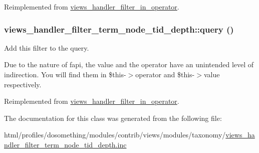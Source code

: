 Reimplemented from \hyperlink{classviews__handler__filter__in__operator_a5b972dd25d26a7010ae9f63cbc926577}{views\_\-handler\_\-filter\_\-in\_\-operator}.\hypertarget{classviews__handler__filter__term__node__tid__depth_aff1d2c0057597790a56bffd0674f391a}{
\subsubsection[{query}]{\setlength{\rightskip}{0pt plus 5cm}views\_\-handler\_\-filter\_\-term\_\-node\_\-tid\_\-depth::query ()}}
\label{classviews__handler__filter__term__node__tid__depth_aff1d2c0057597790a56bffd0674f391a}
Add this filter to the query.

Due to the nature of fapi, the value and the operator have an unintended level of indirection. You will find them in \$this-\/$>$operator and \$this-\/$>$value respectively. 

Reimplemented from \hyperlink{classviews__handler__filter__in__operator_af4b9a596ad1e6fbee116977ca0a7d8a9}{views\_\-handler\_\-filter\_\-in\_\-operator}.

The documentation for this class was generated from the following file:\begin{DoxyCompactItemize}
\item 
html/profiles/dosomething/modules/contrib/views/modules/taxonomy/\hyperlink{views__handler__filter__term__node__tid__depth_8inc}{views\_\-handler\_\-filter\_\-term\_\-node\_\-tid\_\-depth.inc}\end{DoxyCompactItemize}
